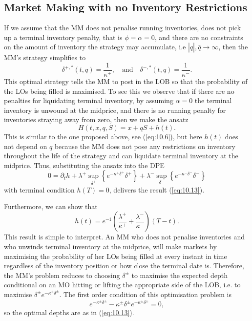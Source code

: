 \documentclass[11pt, a4paper]{book}
\begin{document}
	\subsection{Market Making with no Inventory Restrictions} \label{sec:10.2.1}
	
	If we assume that the MM does not penalise running inventories, does not pick up a terminal inventory penalty, that is $\phi = \alpha = 0$, and there are no constraints on the amount of inventory the strategy may accumulate, i.e $|\underline{q}|, \bar{q} \to \infty$, then the MM's strategy simplifies to
	\begin{equation}
		\boxed{\delta^{+, *}(t, q) = \frac{1}{\kappa^+}, \quad \text{and} \quad \delta^{-, *}(t, q) = \frac{1}{\kappa^-}.} \label{eq:10.13}
	\end{equation}
	This optimal strategy tells the MM to post in the LOB so that the probability of the LOs being filled is maximised. To see this we observe that if there are no penalties for liquidating terminal inventory, by assuming $\alpha = 0$ the terminal inventory is unwound at the midprice, and there is no running penalty for inventories straying away from zero, then we make the ansatz
	\begin{equation}
		H(t, x, q, S) = x + q S + h(t). \label{eq:10.14}
	\end{equation}
	This is similar to the one proposed above, see (\ref{eq:10.6}), but here $h(t)$ does not depend on $q$ because the MM does not pose any restrictions on inventory throughout the life of the strategy and can liquidate terminal inventory at the midprice. Thus, substituting the ansatz into the DPE
	\begin{equation}
		0 = \partial_t h + \lambda^+ \sup_{\delta^+} \left\{ e^{-\kappa^+ \delta^+} \delta^+ \right\} + \lambda^- \sup_{\delta^-} \left\{ e^{-\kappa^- \delta^-} \delta^- \right\} \label{eq:10.15}
	\end{equation}
	with terminal condition $h(T) = 0$, delivers the result (\ref{eq:10.13}).
	
	Furthermore, we can show that
	\[
	h(t) = e^{-1} \left( \frac{\lambda^+}{\kappa^+} + \frac{\lambda^-}{\kappa^-} \right) (T-t).
	\]
	This result is simple to interpret. An MM who does not penalise inventories and who unwinds terminal inventory at the midprice, will make markets by maximising the probability of her LOs being filled at every instant in time regardless of the inventory position or how close the terminal date is. Therefore, the MM's problem reduces to choosing $\delta^\pm$ to maximise the expected depth conditional on an MO hitting or lifting the appropriate side of the LOB, i.e. to maximise $\delta^\pm e^{-\kappa^\pm \delta^\pm}$. The first order condition of this optimisation problem is
	\begin{equation}
		e^{-\kappa^\pm \delta^\pm} - \kappa^\pm \delta^\pm e^{-\kappa^\pm \delta^\pm} = 0, \label{eq:10.16}
	\end{equation}
	so the optimal depths are as in (\ref{eq:10.13}).
	
\end{document}
